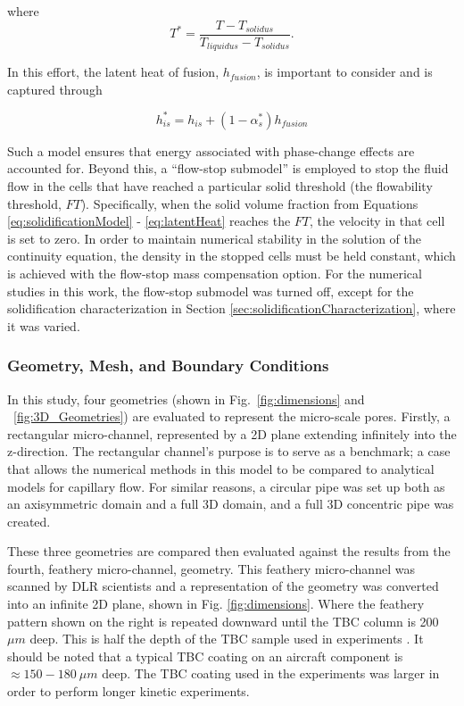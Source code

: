 \documentclass[%
 aip,
 amsmath,amssymb,
 reprint,%
]{revtex4-1}
\begin{document}
\noindent where
\begin{equation}
    T^{*} = \frac{T - T_{solidus}}{T_{liquidus} - T_{solidus}}.
\end{equation}

\noindent In this effort, the latent heat of fusion, $h_{fusion}$, is important to consider and is captured through 

\begin{equation}
    h_{is}^{*} = h_{is} + \left( 1 - \alpha_{s}^{*}\right)h_{fusion}
    \label{eq:latentHeat}
\end{equation}

\noindent Such a model ensures that energy associated with phase-change effects are accounted for. Beyond this, a ``flow-stop submodel'' is employed to stop the fluid flow in the cells that have reached a particular solid threshold (the flowability threshold, $FT$). Specifically, when the solid volume fraction from Equations \ref{eq:solidificationModel} - \ref{eq:latentHeat} reaches the $FT$, the velocity in that cell is set to zero. In order to maintain numerical stability in the solution of the continuity equation, the density in the stopped cells must be held constant, which is achieved with the flow-stop mass compensation option. For the numerical studies in this work, the flow-stop submodel was turned off, except for the solidification characterization in Section \ref{sec:solidificationCharacterization}, where it was varied. 

\subsubsection{Geometry, Mesh, and Boundary Conditions}

In this study, four geometries (shown in Fig.~\ref{fig:dimensions} and ~\ref{fig:3D_Geometries}) are evaluated to represent the micro-scale pores. Firstly, a rectangular micro-channel, represented by a 2D plane extending infinitely into the z-direction. The rectangular channel's purpose is to serve as a benchmark; a case that allows the numerical methods in this model to be compared to analytical models for capillary flow. For similar reasons, a circular pipe was set up both as an axisymmetric domain and a full 3D domain, and a full 3D concentric pipe was created. 

These three geometries are compared then evaluated against the results from the fourth, feathery micro-channel, geometry. This feathery micro-channel was scanned by DLR scientists \cite{Sirigiri2018} and a representation of the geometry was converted into an infinite 2D plane, shown in Fig. \ref{fig:dimensions}. Where the feathery pattern shown on the right is repeated downward until the TBC column is 200 $\mu m$ deep. This is half the depth of the TBC sample used in experiments \cite{Naraparaju2019}. It should be noted that a typical TBC coating on an aircraft component is $\approx 150 - 180~\mu m$ deep. The TBC coating used in the experiments was larger in order to perform longer kinetic experiments. 
\end{document}
